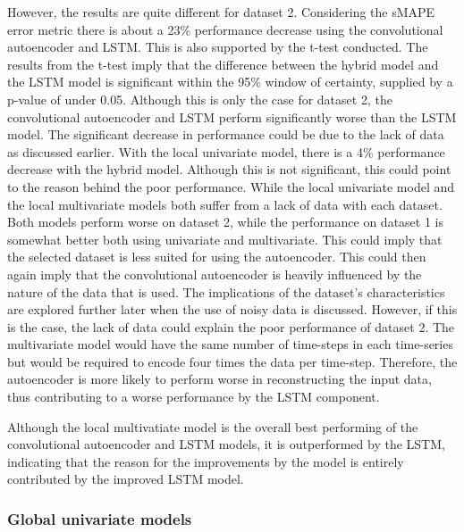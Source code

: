 However, the results are quite different for dataset 2.
Considering the sMAPE error metric there is about a 23\% performance decrease using the convolutional autoencoder and LSTM.
This is also supported by the t-test conducted. The results from the t-test imply that the difference between the hybrid model and the LSTM model
is significant within the 95\% window of certainty, supplied by a p-value of under 0.05.
Although this is only the case for dataset 2, the convolutional autoencoder and LSTM perform significantly worse than the LSTM model.
The significant decrease in performance could be due to the lack of data as discussed earlier.
With the local univariate model, there is a 4\% performance decrease with the hybrid model.
Although this is not significant, this could point to the reason behind the poor performance.
While the local univariate model and the local multivariate models both suffer from a lack of data with each dataset.
Both models perform worse on dataset 2, while the performance on dataset 1 is somewhat better both using univariate and multivariate.
This could imply that the selected dataset is less suited for using the autoencoder.
This could then again imply that the convolutional autoencoder is heavily influenced by the nature of the data that is used.
The implications of the dataset's characteristics are explored further later when the use of noisy data is discussed.
However, if this is the case, the lack of data could explain the poor performance of dataset 2.
The multivariate model would have the same number of time-steps in each time-series but would be required to encode four times the data per time-step.
Therefore, the autoencoder is more likely to perform worse in reconstructing the input data,
thus contributing to a worse performance by the LSTM component.


Although the local multivatiate model is the overall best performing of the convolutional autoencoder and LSTM models,
it is outperformed by the LSTM, indicating that the reason for the improvements by the model
is entirely contributed by the improved LSTM model.


\subsubsection{Global univariate models}


